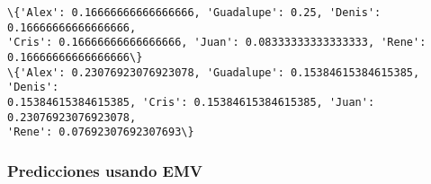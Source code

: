 \documentclass[11pt]{article}
\begin{document}
    \begin{Verbatim}[commandchars=\\\{\}]
\{'Alex': 0.16666666666666666, 'Guadalupe': 0.25, 'Denis': 0.16666666666666666,
'Cris': 0.16666666666666666, 'Juan': 0.08333333333333333, 'Rene':
0.16666666666666666\}
\{'Alex': 0.23076923076923078, 'Guadalupe': 0.15384615384615385, 'Denis':
0.15384615384615385, 'Cris': 0.15384615384615385, 'Juan': 0.23076923076923078,
'Rene': 0.07692307692307693\}
    \end{Verbatim}

    \hypertarget{predicciones-usando-emv}{%
\subsubsection{Predicciones usando EMV}\label{predicciones-usando-emv}}
\end{document}
